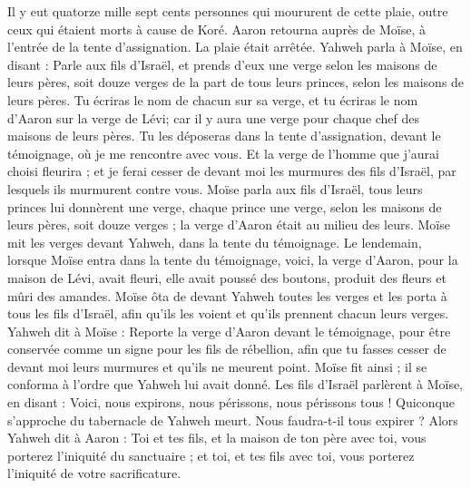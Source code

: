 \begin{multicols}{2}
Il y eut quatorze mille sept cents personnes qui moururent de cette plaie, outre ceux qui étaient morts à cause de Koré.
Aaron retourna auprès de Moïse, à l'entrée de la tente d'assignation. La plaie était arrêtée.
\VerseOne{}Yahweh parla à Moïse, en disant :
Parle aux fils d'Israël, et prends d'eux une verge selon les maisons de leurs pères, soit douze verges de la part de tous leurs princes, selon les maisons de leurs pères. Tu écriras le nom de chacun sur sa verge,
et tu écriras le nom d'Aaron sur la verge de Lévi; car il y aura une verge pour chaque chef des maisons de leurs pères.
Tu les déposeras dans la tente d'assignation, devant le témoignage, où je me rencontre avec vous.
Et la verge de l'homme que j'aurai choisi fleurira ; et je ferai cesser de devant moi les murmures des fils d'Israël, par lesquels ils murmurent contre vous.
Moïse parla aux fils d'Israël, tous leurs princes lui donnèrent une verge, chaque prince une verge, selon les maisons de leurs pères, soit douze verges ; la verge d'Aaron était au milieu des leurs.
Moïse mit les verges devant Yahweh, dans la tente du témoignage.
Le lendemain, lorsque Moïse entra dans la tente du témoignage, voici, la verge d'Aaron, pour la maison de Lévi, avait fleuri, elle avait poussé des boutons, produit des fleurs et mûri des amandes.
Moïse ôta de devant Yahweh toutes les verges et les porta à tous les fils d'Israël, afin qu'ils les voient et qu'ils prennent chacun leurs verges.
Yahweh dit à Moïse : Reporte la verge d'Aaron devant le témoignage, pour être conservée comme un signe pour les fils de rébellion, afin que tu fasses cesser de devant moi leurs murmures et qu'ils ne meurent point.
Moïse fit ainsi ; il se conforma à l'ordre que Yahweh lui avait donné.
Les fils d'Israël parlèrent à Moïse, en disant : Voici, nous expirons, nous périssons, nous périssons tous !
Quiconque s'approche du tabernacle de Yahweh meurt. Nous faudra-t-il tous expirer ?
\VerseOne{}Alors Yahweh dit à Aaron : Toi et tes fils, et la maison de ton père avec toi, vous porterez l'iniquité du sanctuaire ; et toi, et tes fils avec toi, vous porterez l'iniquité de votre sacrificature.

\end{multicols}
